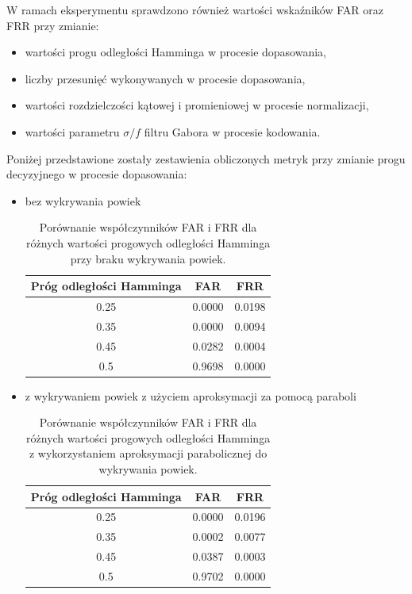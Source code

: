 \noindent
W ramach eksperymentu sprawdzono również wartości wska\'zników FAR oraz FRR przy zmianie:

\begin{itemize}
  \item wartości progu odległości Hamminga w procesie dopasowania,
  \item liczby przesunię\'c wykonywanych w procesie dopasowania,
  \item wartości rozdzielczości kątowej i promieniowej w procesie normalizacji,
  \item wartości parametru $\mathit{\sigma/f}$ filtru Gabora w procesie kodowania.
\end{itemize}

\noindent
Poniżej przedstawione zostały zestawienia obliczonych metryk przy zmianie progu decyzyjnego
w procesie dopasowania:

\begin{itemize}
  \item bez wykrywania powiek

  \begin{table}[ht]
    \centering
    \begin{tabular}{c|c|c}
      \rowcolor{gray!20}
      Próg odległości Hamminga & FAR & FRR \\
      \hline\hline
      0.25 & 0.0000 & 0.0198 \\
      \hline
      0.35 & 0.0000 & 0.0094 \\
      \hline
      0.45 & 0.0282 & 0.0004 \\
      \hline
      0.5 & 0.9698 & 0.0000 \\
    \end{tabular}
    \caption{Porównanie współczynników FAR i FRR dla różnych wartości progowych odległości Hamminga
    przy braku wykrywania powiek.}
  \end{table}

  \item z wykrywaniem powiek z użyciem aproksymacji za pomocą paraboli

  \begin{table}[ht]
    \centering
    \begin{tabular}{c|c|c}
      \rowcolor{gray!20}
      Próg odległości Hamminga & FAR & FRR \\
      \hline\hline
      0.25 & 0.0000 & 0.0196 \\
      \hline
      0.35 & 0.0002 & 0.0077 \\
      \hline
      0.45 & 0.0387 & 0.0003 \\
      \hline
      0.5 & 0.9702 & 0.0000 \\
    \end{tabular}
    \caption{Porównanie współczynników FAR i FRR dla różnych wartości progowych odległości Hamminga
    z wykorzystaniem aproksymacji parabolicznej do wykrywania powiek.}
  \end{table}
\end{itemize}

